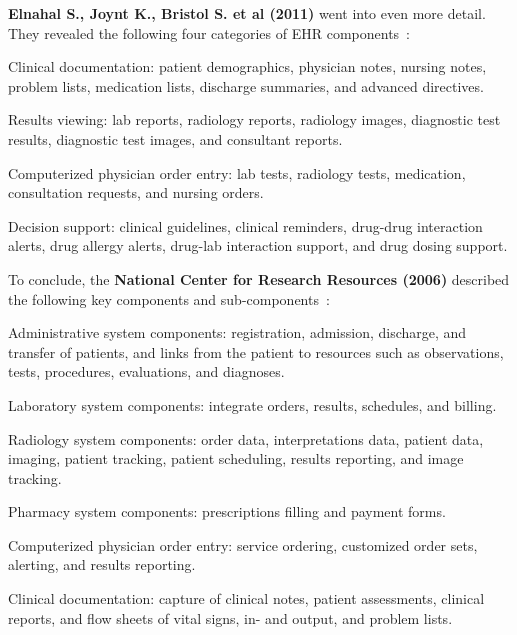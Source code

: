         \noindent \textbf{Elnahal S., Joynt K., Bristol S. et al (2011)} went into even more detail. They revealed the following four categories of EHR components~\cite{Elnahal2011}:
        \vspace{-0.5\topsep}
        \begin{myitemize}
            \item Clinical documentation: patient demographics, physician notes, nursing notes, problem lists, medication lists, discharge summaries, and advanced directives.
            \item Results viewing: lab reports, radiology reports, radiology images, diagnostic test results, diagnostic test images, and consultant reports.
            \item Computerized physician order entry: lab tests, radiology tests, medication, consultation requests, and nursing orders.
            \item Decision support: clinical guidelines, clinical reminders, drug-drug interaction alerts, drug allergy alerts, drug-lab interaction support, and drug dosing support.
        \end{myitemize}

        \noindent To conclude, the \textbf{National Center for Research Resources (2006)} described the following key components and sub-components~\cite{NCRR2006}:
        \begin{myitemize}
            \item Administrative system components: registration, admission, discharge, and transfer of patients, and links from the patient to resources such as observations, tests, procedures, evaluations, and diagnoses.
            \item Laboratory system components: integrate orders, results, schedules, and billing.
            \item Radiology system components: order data, interpretations data, patient data, imaging, patient tracking, patient scheduling, results reporting, and image tracking.
            \item Pharmacy system components: prescriptions filling and payment forms.
            \item Computerized physician order entry: service ordering, customized order sets, alerting, and results reporting.
            \item Clinical documentation: capture of clinical notes, patient assessments, clinical reports, and flow sheets of vital signs, in- and output, and problem lists.
        \end{myitemize}

